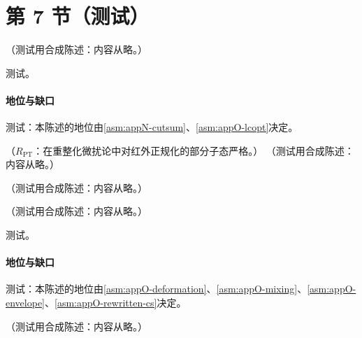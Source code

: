 \section{第 7 节（测试）}\label{sec:method-glauber}

\begin{proposition}\label{prop:method-fsi}
（测试用合成陈述：内容从略。）
\end{proposition}
\begin{proofsketch}测试。\end{proofsketch}
\paragraph{地位与缺口}测试：本陈述的地位由\cref{asm:appN-cutsum}、\cref{asm:appO-lcopt}决定。

\begin{proposition}\label{prop:method-glauber-oneloop}
（$R_{\mathrm{PT}}$：在重整化微扰论中对红外正规化的部分子态严格。）
（测试用合成陈述：内容从略。）
\end{proposition}

\begin{example}[单胶子交换的极点图]\label{ex:method-glauber-oneloop}
（测试用合成陈述：内容从略。）
\end{example}

\begin{proposition}\label{prop:method-glauber-deformation}
（测试用合成陈述：内容从略。）
\end{proposition}
\begin{proofsketch}测试。\end{proofsketch}
\paragraph{地位与缺口}测试：本陈述的地位由\cref{asm:appO-deformation}、\cref{asm:appO-mixing}、\cref{asm:appO-envelope}、\cref{asm:appO-rewritten-cs}决定。

\begin{remark}[一个分量的形变为何不够]\label{rem:method-two-component}
（测试用合成陈述：内容从略。）
\end{remark}

